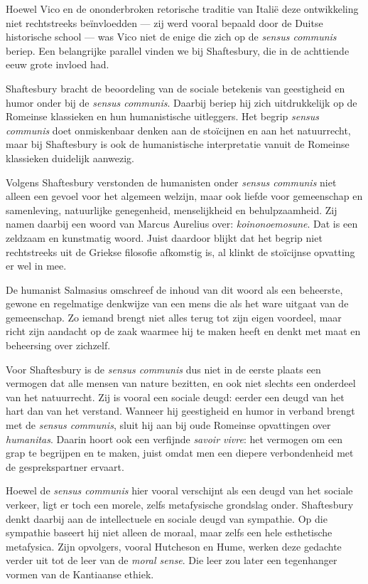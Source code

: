 Hoewel Vico en de ononderbroken retorische traditie van Italië deze ontwikkeling niet rechtstreeks beïnvloedden — zij werd vooral bepaald door de Duitse historische school — was Vico niet de enige die zich op de \textit{sensus communis} beriep. Een belangrijke parallel vinden we bij Shaftesbury, die in de achttiende eeuw grote invloed had.

Shaftesbury bracht de beoordeling van de sociale betekenis van geestigheid en humor onder bij de \textit{sensus communis}. Daarbij beriep hij zich uitdrukkelijk op de Romeinse klassieken en hun humanistische uitleggers. Het begrip \textit{sensus communis} doet onmiskenbaar denken aan de stoïcijnen en aan het natuurrecht, maar bij Shaftesbury is ook de humanistische interpretatie vanuit de Romeinse klassieken duidelijk aanwezig.

Volgens Shaftesbury verstonden de humanisten onder \textit{sensus communis} niet alleen een gevoel voor het algemeen welzijn, maar ook liefde voor gemeenschap en samenleving, natuurlijke genegenheid, menselijkheid en behulpzaamheid. Zij namen daarbij een woord van Marcus Aurelius over: \textit{koinonoemosune}. Dat is een zeldzaam en kunstmatig woord. Juist daardoor blijkt dat het begrip niet rechtstreeks uit de Griekse filosofie afkomstig is, al klinkt de stoïcijnse opvatting er wel in mee.

De humanist Salmasius omschreef de inhoud van dit woord als een beheerste, gewone en regelmatige denkwijze van een mens die als het ware uitgaat van de gemeenschap. Zo iemand brengt niet alles terug tot zijn eigen voordeel, maar richt zijn aandacht op de zaak waarmee hij te maken heeft en denkt met maat en beheersing over zichzelf.

Voor Shaftesbury is de \textit{sensus communis} dus niet in de eerste plaats een vermogen dat alle mensen van nature bezitten, en ook niet slechts een onderdeel van het natuurrecht. Zij is vooral een sociale deugd: eerder een deugd van het hart dan van het verstand. Wanneer hij geestigheid en humor in verband brengt met de \textit{sensus communis}, sluit hij aan bij oude Romeinse opvattingen over \textit{humanitas}. Daarin hoort ook een verfijnde \textit{savoir vivre}: het vermogen om een grap te begrijpen en te maken, juist omdat men een diepere verbondenheid met de gesprekspartner ervaart.

Hoewel de \textit{sensus communis} hier vooral verschijnt als een deugd van het sociale verkeer, ligt er toch een morele, zelfs metafysische grondslag onder. Shaftesbury denkt daarbij aan de intellectuele en sociale deugd van sympathie. Op die sympathie baseert hij niet alleen de moraal, maar zelfs een hele esthetische metafysica. Zijn opvolgers, vooral Hutcheson en Hume, werken deze gedachte verder uit tot de leer van de \textit{moral sense}. Die leer zou later een tegenhanger vormen van de Kantiaanse ethiek.

